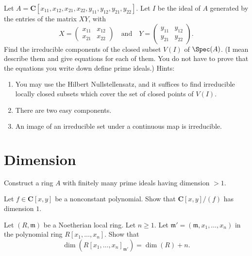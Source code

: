 \begin{exercise}
\label{exercise-product-matrices-ring}
Let $A =
{\mathbf C}[x_{11}, x_{12}, x_{21}, x_{22}, y_{11}, y_{12}, y_{21}, y_{22}]$.
Let $I$ be the ideal of $A$ generated by the entries of the
matrix $XY$, with
$$
X = \left(
\begin{matrix}
x_{11} & x_{12}\\
x_{21} & x_{22}
\end{matrix}
\right)
\quad\text{and}\quad
Y = \left(
\begin{matrix}
y_{11} & y_{12}\\
y_{21} & y_{22}
\end{matrix}
\right).
$$
Find the irreducible components of the closed subset $V(I)$ of
$\Spec(A)$.
(I mean describe them and give equations for each of them. You do not have
to prove that the equations you write down define prime ideals.) Hints:
\begin{enumerate}
\item You may use the Hilbert Nullstellensatz, and it suffices to find
irreducible locally closed subsets which cover the set of closed points of
$V(I)$.
\item There are two easy components.
\item An image of an irreducible set under a continuous map is
irreducible.
\end{enumerate}
\end{exercise}




\section{Dimension}
\label{section-dimension}

\begin{exercise}
\label{exercise-dimension-bigger-one-finite-nr-primes}
Construct a ring $A$ with finitely many prime ideals having dimension $> 1$.
\end{exercise}

\begin{exercise}
\label{exercise-hypersurface-in-A2-dimension-one}
Let $f \in \mathbf{C}[x, y]$ be a nonconstant polynomial.
Show that $\mathbf{C}[x, y]/(f)$ has dimension $1$.
\end{exercise}

\begin{exercise}
\label{exercise-dimension-polynomial-ring}
Let $(R, \mathfrak m)$ be a Noetherian local ring.
Let $n \geq 1$. Let $\mathfrak m' = (\mathfrak m, x_1, \ldots, x_n)$
in the polynomial ring $R[x_1, \ldots, x_n]$.
Show that
$$
\dim(R[x_1, \ldots, x_n]_{\mathfrak m'}) = \dim(R) + n.
$$
\end{exercise}





